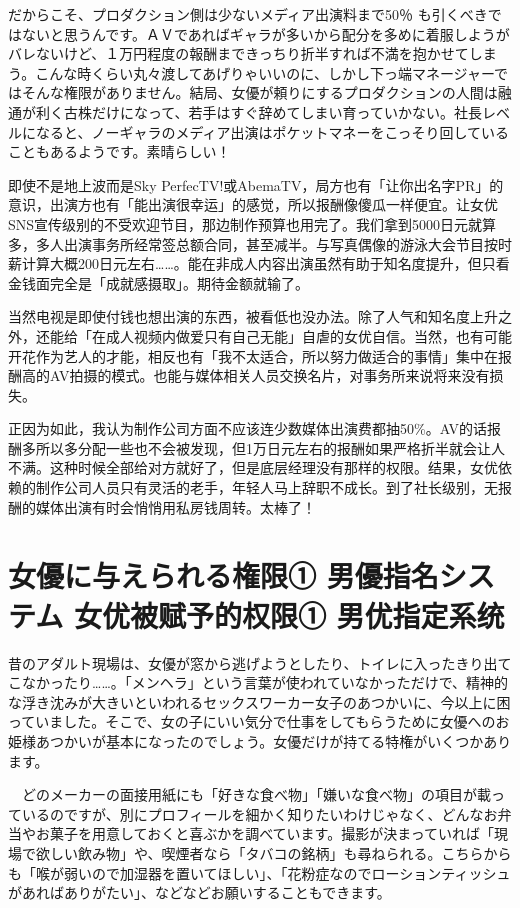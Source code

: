 \documentclass[12pt,UTF8]{ctexbook}
\begin{document}
だからこそ、プロダクション側は少ないメディア出演料まで50％ も引くべきではないと思うんです。ＡＶであればギャラが多いから配分を多めに着服しようがバレないけど、１万円程度の報酬まできっちり折半すれば不満を抱かせてしまう。こんな時くらい丸々渡してあげりゃいいのに、しかし下っ端マネージャーではそんな権限がありません。結局、女優が頼りにするプロダクションの人間は融通が利く古株だけになって、若手はすぐ辞めてしまい育っていかない。社長レベルになると、ノーギャラのメディア出演はポケットマネーをこっそり回していることもあるようです。素晴らしい！


即使不是地上波而是Sky PerfecTV!或AbemaTV，局方也有「让你出名字PR」的意识，出演方也有「能出演很幸运」的感觉，所以报酬像傻瓜一样便宜。让女优SNS宣传级别的不受欢迎节目，那边制作预算也用完了。我们拿到5000日元就算多，多人出演事务所经常签总额合同，甚至减半。与写真偶像的游泳大会节目按时薪计算大概200日元左右……。能在非成人内容出演虽然有助于知名度提升，但只看金钱面完全是「成就感摄取」。期待金额就输了。

当然电视是即使付钱也想出演的东西，被看低也没办法。除了人气和知名度上升之外，还能给「在成人视频内做爱只有自己无能」自虐的女优自信。当然，也有可能开花作为艺人的才能，相反也有「我不太适合，所以努力做适合的事情」集中在报酬高的AV拍摄的模式。也能与媒体相关人员交换名片，对事务所来说将来没有损失。

正因为如此，我认为制作公司方面不应该连少数媒体出演费都抽50\%。AV的话报酬多所以多分配一些也不会被发现，但1万日元左右的报酬如果严格折半就会让人不满。这种时候全部给对方就好了，但是底层经理没有那样的权限。结果，女优依赖的制作公司人员只有灵活的老手，年轻人马上辞职不成长。到了社长级别，无报酬的媒体出演有时会悄悄用私房钱周转。太棒了！

\section{女優に与えられる権限①
 男優指名システム
女优被赋予的权限① 男优指定系统}

昔のアダルト現場は、女優が窓から逃げようとしたり、トイレに入ったきり出てこなかったり……。「メンヘラ」という言葉が使われていなかっただけで、精神的な浮き沈みが大きいといわれるセックスワーカー女子のあつかいに、今以上に困っていました。そこで、女の子にいい気分で仕事をしてもらうために女優へのお姫様あつかいが基本になったのでしょう。女優だけが持てる特権がいくつかあります。

　どのメーカーの面接用紙にも「好きな食べ物」「嫌いな食べ物」の項目が載っているのですが、別にプロフィールを細かく知りたいわけじゃなく、どんなお弁当やお菓子を用意しておくと喜ぶかを調べています。撮影が決まっていれば「現場で欲しい飲み物」や、喫煙者なら「タバコの銘柄」も尋ねられる。こちらからも「喉が弱いので加湿器を置いてほしい」、「花粉症なのでローションティッシュがあればありがたい」、などなどお願いすることもできます。
\end{document}
